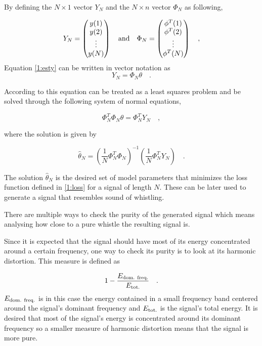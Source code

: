 \documentclass{IEEEtran}
\begin{document}
By defining the $N\times1$ vector $Y_N$ and the $N\times n$ vector
$\Phi_N$ as following,

\begin{equation}
  Y_N =
  \begin{pmatrix}
    y(1) \\ y(2) \\ \vdots \\ y(N)
  \end{pmatrix}
  \quad
  \textnormal{and}
  \quad
  \Phi_N =
  \begin{pmatrix}
    \phi^T(1) \\ \phi^T(2) \\ \vdots \\ \phi^T(N)
  \end{pmatrix}
  \quad ,
\end{equation}
Equation \ref{1:esty} can be written in vector notation as
\begin{equation}
  Y_N = \Phi_N\theta \quad .
\end{equation}

According to \cite{signalproc} this equation can be treated as a least
squares problem and be solved through the following system of normal
equations,

\begin{equation}
  \Phi_N^T\Phi_N\theta = \Phi_N^T Y_N \quad ,
\end{equation}

where the solution is given by

\begin{equation}
  \hat{\theta}_N = \left( \frac{1}{N}\Phi_N^T\Phi_N \right)^{-1}
                   \left( \frac{1}{N}\Phi_N^T Y_N \right)
  \quad .
\end{equation}

The solution $\hat{\theta}_N$ is the desired set of model parameters
that minimizes the loss function defined in \ref{1:loss} for a signal
of length $N$. These can be later used to generate a signal that
resembles sound of whistling.

There are multiple ways to check the purity of the generated signal which
means analysing how close to a pure whistle the resulting signal is.

Since it is expected that the signal should have most of its energy
concentrated around a certain frequency, one way to check its purity
is to look at its harmonic distortion. This measure is defined as

\begin{equation}
  \label{1:hdist}
  1 - \frac{E_{\textnormal{dom. freq.}}}{E_{\textnormal{tot.}}}\quad .
\end{equation}
$E_{\textnormal{dom. freq.}}$ is in this case the energy contained in
a small frequency band centered around the signal's dominant frequency
and $E_{\textnormal{tot.}}$ is the signal's total energy. It is desired
that most of the signal's energy is concentrated around its dominant
frequency so a smaller measure of harmonic distortion means that the
signal is more pure.
\end{document}
